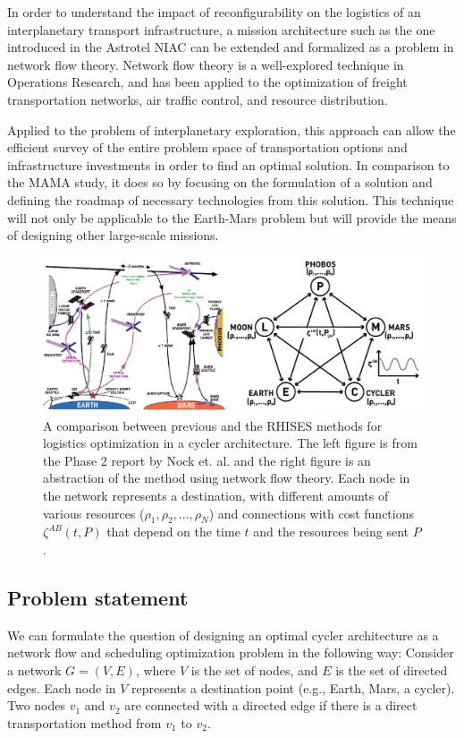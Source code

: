 \documentclass[NIACPhase1B.tex]{subfiles}
\begin{document}
In order to understand the impact of reconfigurability on the logistics of an interplanetary transport infrastructure, a mission architecture such as the one introduced in the Astrotel NIAC can be extended and formalized as a problem in network flow theory. Network flow theory is a well-explored technique in Operations Research, and has been applied to the optimization of freight transportation networks, air traffic control, and resource distribution. 

Applied to the problem of interplanetary exploration, this approach can allow the efficient survey of the entire problem space of transportation options and infrastructure investments in order to find an optimal solution. In comparison to the MAMA study, it does so by focusing on the formulation of a solution and defining the roadmap of necessary technologies from this solution. This technique will not only be applicable to the Earth-Mars problem but will provide the means of designing other large-scale missions.

\begin{figure}
\centering
\includegraphics[width=1.0\textwidth]{Media/cycler_opt.png}
\caption{A comparison between previous and the RHISES methods for logistics optimization in a cycler architecture. The left figure is from the Phase 2 report by Nock et. al. and the right figure is an abstraction of the method using network flow theory. Each node in the network represents a destination, with different amounts of various resources ($\rho_1, \rho_2,..., \rho_N$) and connections with cost functions $\zeta^{AB}(t,P)$ that depend on the time $t$ and the resources being sent $P$.}
\end{figure}

\subsection{Problem statement}

We can formulate the question of designing an optimal cycler architecture as a network flow and scheduling optimization problem in the following way: Consider a network $G=(V,E)$, where $V$ is the set of nodes, and $E$ is the set of directed edges. Each node in $V$ represents a destination point (e.g., Earth, Mars, a cycler). Two nodes $v_1$ and $v_2$ are connected with a directed edge if there is a direct transportation method from $v_1$ to $v_2$.
\end{document}
